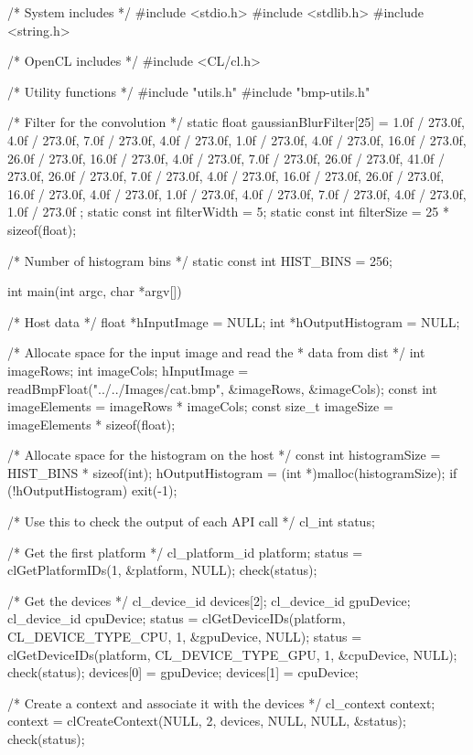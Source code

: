 \begin{codebox}[cpp]
/* System includes */
#include <stdio.h>
#include <stdlib.h>
#include <string.h>

/* OpenCL includes */
#include <CL/cl.h>

/* Utility functions */
#include "utils.h"
#include "bmp-utils.h"

/* Filter for the convolution */
static float gaussianBlurFilter[25] = {
  1.0f / 273.0f, 4.0f / 273.0f, 7.0f / 273.0f, 4.0f / 273.0f, 1.0f / 273.0f,
  4.0f / 273.0f, 16.0f / 273.0f, 26.0f / 273.0f, 16.0f / 273.0f, 4.0f / 273.0f,
  7.0f / 273.0f, 26.0f / 273.0f, 41.0f / 273.0f, 26.0f / 273.0f, 7.0f / 273.0f,
  4.0f / 273.0f, 16.0f / 273.0f, 26.0f / 273.0f, 16.0f / 273.0f, 4.0f / 273.0f,
  1.0f / 273.0f, 4.0f / 273.0f, 7.0f / 273.0f, 4.0f / 273.0f, 1.0f / 273.0f
};
static const int filterWidth = 5;
static const int filterSize = 25 * sizeof(float);

/* Number of histogram bins */
static const int HIST_BINS = 256;

int main(int argc, char *argv[])
{
  /* Host data */
  float *hInputImage = NULL;
  int *hOutputHistogram = NULL;

  /* Allocate space for the input image and read the
   * data from dist */
  int imageRows;
  int imageCols;
  hInputImage = readBmpFloat("../../Images/cat.bmp", &imageRows, &imageCols);
  const int imageElements = imageRows * imageCols;
  const size_t imageSize = imageElements * sizeof(float);

  /* Allocate space for the histogram on the host */
  const int histogramSize = HIST_BINS * sizeof(int);
  hOutputHistogram = (int *)malloc(histogramSize);
  if (!hOutputHistogram){ exit(-1); }

  /* Use this to check the output of each API call */
  cl_int status;

  /* Get the first platform */
  cl_platform_id platform;
  status = clGetPlatformIDs(1, &platform, NULL);
  check(status);

  /* Get the devices */
  cl_device_id devices[2];
  cl_device_id gpuDevice;
  cl_device_id cpuDevice;
  status = clGetDeviceIDs(platform, CL_DEVICE_TYPE_CPU, 1, &gpuDevice, NULL);
  status = clGetDeviceIDs(platform, CL_DEVICE_TYPE_GPU, 1, &cpuDevice, NULL);
  check(status);
  devices[0] = gpuDevice;
  devices[1] = cpuDevice;

  /* Create a context and associate it with the devices */
  cl_context context;
  context = clCreateContext(NULL, 2, devices, NULL, NULL, &status);
  check(status);

}
\end{codebox}
